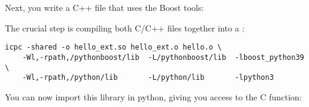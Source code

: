 Next, you write a C++ file that uses the Boost tools:
%


The crucial step is compiling both C/C++ files together
into a :
\begin{verbatim}
icpc -shared -o hello_ext.so hello_ext.o hello.o \
    -Wl,-rpath,/pythonboost/lib  -L/pythonboost/lib  -lboost_python39 \
    -Wl,-rpath,/python/lib       -L/python/lib       -lpython3
\end{verbatim}

You can now import this library in python,
giving you access to the C function:
%





